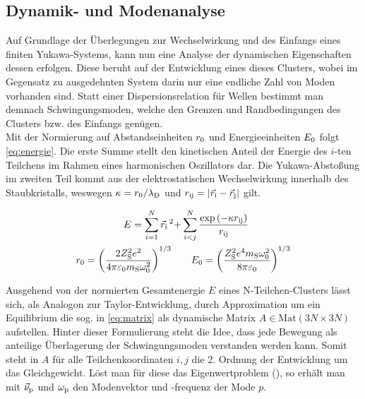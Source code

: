       \subsection{Dynamik- und Modenanalyse} \label{subsub:moden}

        Auf Grundlage der Überlegungen zur Wechselwirkung und des Einfangs eines finiten Yukawa-Systems, kann nun eine Analyse der dynamischen Eigenschaften dessen erfolgen. Diese beruht auf der Entwicklung eines  dieses Clusters, wobei im Gegensatz zu ausgedehnten System darin nur eine endliche Zahl von Moden vorhanden sind. Statt einer Dispersionsrelation für Wellen bestimmt man demnach Schwingungsmoden, welche den Grenzen und Randbedingungen des Clusters bzw. des Einfangs genügen.\\
        Mit der Normierung auf Abstandseinheiten $r_\text{0}$ und Energieeinheiten $E_\text{0}$ folgt \autoref{eq:energie}. Die erste Summe stellt den kinetischen Anteil der Energie des $i$-ten Teilchens im Rahmen eines harmonischen Oszillators dar. Die Yukawa-Abstoßung im zweiten Teil kommt aus der elektrostatischen Wechselwirkung innerhalb des Staubkristalls, weswegen $\kappa=r_\text{0}/\lambda_\text{D}$ und $r_\text{ij}=|\vec{r}_\text{i}-\vec{r}_\text{j}|$ gilt.

          \begin{align}
            E=\sum_{i=1}^{N}\vec{r}_\text{i}\,^2+&\sum_{i<j}^{N}\frac{\exp\left(-\kappa r_\text{ij}\right)}{r_\text{ij}} \label{eq:energie} \\
            r_\text{0}=\left(\frac{2Z_\text{S}^2e^2}{4\pi\varepsilon_\text{0}m_\text{S}\omega_\text{0}^2}\right)^{1/3} \quad &\quad E_\text{0}=\left(\frac{Z_\text{S}^2e^4m_\text{S}\omega_\text{0}^2}{8\pi\varepsilon_\text{0}}\right)^{1/3} \nonumber
          \end{align}

        Ausgehend von der normierten Gesamtenergie $E$ eines N-Teilchen-Clusters lässt sich, als Analogon zur Taylor-Entwicklung, durch Approximation um ein Equilibrium die sog.  in \autoref{eq:matrix} als dynamische Matrix $A\in\text{Mat}\left(3N\times3N\right)$ aufstellen. Hinter dieser Formulierung steht die Idee, dass jede Bewegung als anteilige Überlagerung der Schwingungsmoden verstanden werden kann. Somit steht in $A$ für alle Teilchenkoordinaten $i,j$ die 2. Ordnung der Entwicklung um das Gleichgewicht. Löst man für diese das Eigenwertproblem (\cite{Schweigert95c}), so erhält man mit $\vec{\nu}_\text{p}$ und $\omega_\text{p}$ den Modenvektor und -frequenz der Mode $p$.


